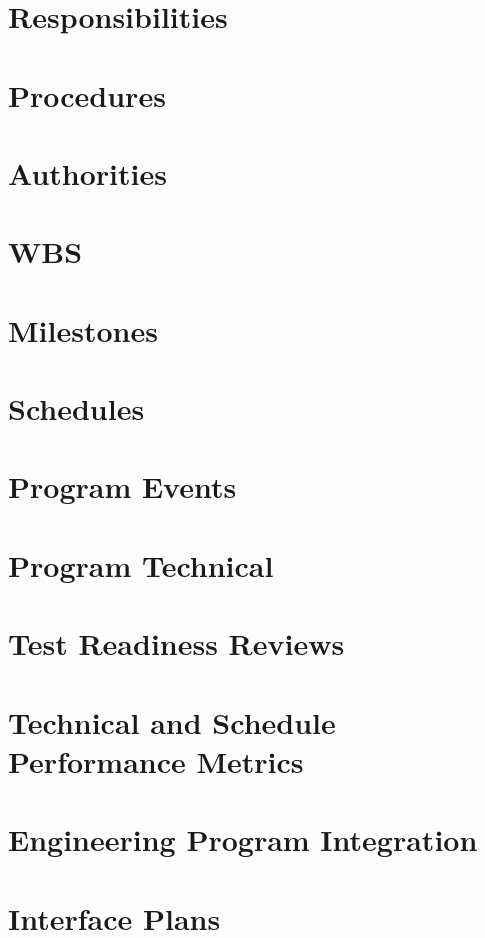 \section{Responsibilities}

\section{Procedures}

\section{Authorities}

\section{WBS}

\section{Milestones}

\section{Schedules}

\section{Program Events}

\section{Program Technical}

\section{Test Readiness Reviews}

\section{Technical and Schedule Performance Metrics}

\section{Engineering Program Integration}

\section{Interface Plans}
